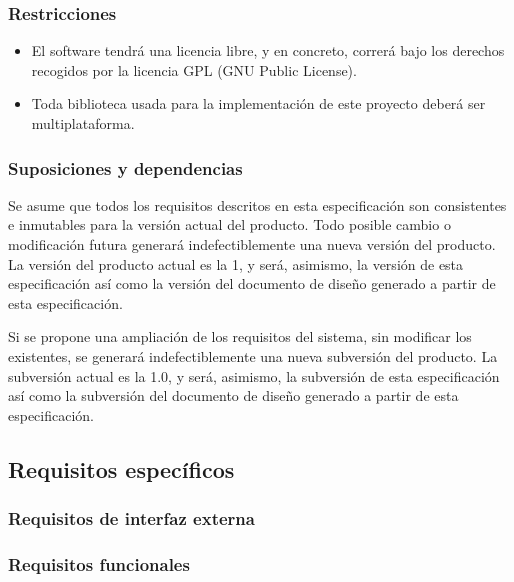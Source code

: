 \subsubsection{Restricciones}
\begin{itemize}
\item El software tendrá una licencia libre, y en concreto, correrá bajo los derechos recogidos por la licencia GPL (GNU Public License).
\item Toda biblioteca usada para la implementación de este proyecto deberá ser multiplataforma.
\end{itemize}

\subsubsection{Suposiciones y dependencias}
Se asume que todos los requisitos descritos en esta especificación son consistentes e inmutables para la versión actual del producto. Todo posible cambio o modificación futura generará indefectiblemente una nueva versión del producto. La versión del producto actual es la 1, y será, asimismo, la versión de esta especificación así como la versión del documento de diseño generado a partir de esta especificación.

Si se propone una ampliación de los requisitos del sistema, sin modificar los existentes, se generará indefectiblemente una nueva subversión del producto. La subversión actual es la 1.0, y será, asimismo, la subversión de esta especificación así como la subversión del documento de diseño generado a partir de esta especificación.

\subsection{Requisitos específicos}

\subsubsection{Requisitos de interfaz externa}


\subsubsection{Requisitos funcionales}

